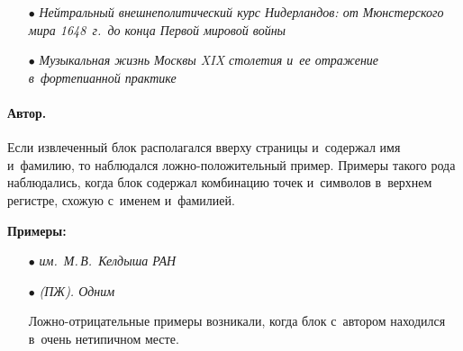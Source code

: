 \begin{multicols}{2}
\begin{itemize}
\item[$\bullet$]
\textit{Нейтральный внешнеполитический курс Нидерландов: от Мюнстерского мира 
1648~г.\ до конца Первой мировой войны}\\[-14.5pt]

\item[$\bullet$]
\textit{Музыкальная жизнь Москвы XIX столетия и~ее отражение в~фортепианной 
практике}
\end{itemize}

\vspace*{-13pt}

\paragraph*{Автор.}

Если извлеченный блок располагался вверху страницы и~содержал имя и~фамилию, то 
наблюдался лож\-но-по\-ло\-жи\-тель\-ный пример. Примеры такого рода наблюдались, когда 
блок содержал комбинацию точек и~символов в~верх\-нем регистре, схожую с~именем 
и~фамилией.

\textbf{Примеры:}

\begin{itemize}
\item[$\bullet$]
\textit{им.\ М.\,В.~Келдыша РАН}\\[-15pt]

\item[$\bullet$]
\textit{(ПЖ). Одним}

Ложно-отрицательные примеры возникали, когда блок с~автором находился в~очень 
нетипичном месте.\\[-15pt]
\end{itemize}

\end{multicols}

\begin{figure*} %
\vspace*{1pt}
 \begin{center}
 \mbox{%
 \epsfxsize=165.459mm 
 }
 \end{center}
\vspace*{-9pt}
    \label{fig:figure4}
\end{figure*}

